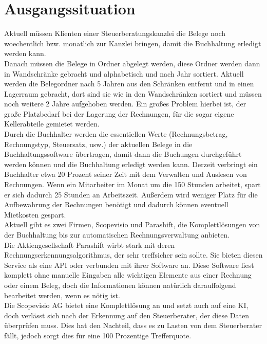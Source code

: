 \documentclass[12pt]{article}
\theoremstyle{definition}
\begin{document}
\section{Ausgangssituation}
Aktuell müssen Klienten einer Steuerberatungskanzlei die Belege noch woechentlich bzw. monatlich zur Kanzlei bringen, damit die Buchhaltung erledigt werden kann.\\
	
Danach müssen die Belege in Ordner abgelegt werden, diese Ordner werden dann in Wandschränke gebracht und alphabetisch und nach Jahr sortiert. Aktuell werden die Belegordner nach 5 Jahren aus den Schränken entfernt und in einen Lagerraum gebracht, dort sind sie wie in den Wandschränken sortiert und müssen noch weitere 2 Jahre aufgehoben werden. Ein großes Problem hierbei ist, der große Platzbedarf bei der Lagerung der Rechnungen, für die sogar eigene Kellerabteile gemietet werden.\\
	
Durch die Buchhalter werden die essentiellen Werte (Rechnungsbetrag, Rechnungstyp, Steuersatz, usw.) der aktuellen Belege in die Buchhaltungssoftware über\-tragen, damit dann die Buchungen durchgeführt werden können und die Buchhaltung erledigt werden kann.
Derzeit verbringt ein Buchhalter etwa 20 Prozent seiner Zeit mit dem Verwalten und Auslesen von Rechnungen. Wenn ein Mitarbeiter im Monat um die 150 Stunden arbeitet, spart er sich dadurch 25 Stunden an Arbeitszeit. Außerdem wird weniger Platz für die Aufbewahrung der Rechnungen benötigt und dadurch können eventuell Mietkosten gespart. \\
	
Aktuell gibt es zwei Firmen, Scopevisio und Parashift, die Komplettlösungen von der Buchhaltung bis zur automatischen Rechnungsverwaltung anbieten.\\

Die Aktiengesellschaft Parashift wirbt stark mit deren Rechnungserkennungsalgorithmus, der sehr treffsicher sein sollte. Sie bieten diesen Service als eine API oder verbunden mit ihrer Software an. Diese Software liest komplett ohne manuelle Eingaben alle wichtigen Elemente aus einer Rechnung oder einem Beleg, doch die Informationen können natürlich darauffolgend bearbeitet werden, wenn es nötig ist.\\
	
Die Scopevisio AG bietet eine Komplettlösung an und setzt auch auf eine KI, doch verlässt sich nach der Erkennung auf den Steuerberater, der diese Daten überprüfen muss. Dies hat den Nachteil, dass es zu Lasten von dem Steuerberater fällt, jedoch sorgt dies für eine 100 Prozentige Trefferquote.\\
	
\end{document}
